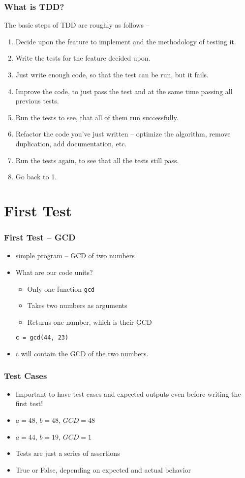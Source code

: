 \documentclass[12pt,presentation]{beamer}
\begin{document}
\begin{frame}
  \frametitle{What is TDD?}
  The basic steps of TDD are roughly as follows --
  \begin{enumerate}
  \item Decide upon the feature to implement and the methodology of
    testing it.
  \item Write the tests for the feature decided upon.
  \item Just write enough code, so that the test can be run, but it fails.
  \item Improve the code, to just pass the test and at the same time
    passing all previous tests.
  \item Run the tests to see, that all of them run successfully.
  \item Refactor the code you've just written -- optimize the algorithm,
    remove duplication, add documentation, etc.
  \item Run the tests again, to see that all the tests still pass.
  \item Go back to 1.
  \end{enumerate}
\end{frame}

\section{First Test}

\begin{frame}[fragile]
  \frametitle{First Test -- GCD}
  \begin{itemize}
  \item simple program -- GCD of two numbers
  \item What are our code units?
    \begin{itemize}
    \item Only one function \texttt{gcd}
    \item Takes two numbers as arguments
    \item Returns one number, which is their GCD
    \end{itemize}
\begin{lstlisting}
c = gcd(44, 23)
\end{lstlisting}
  \item c will contain the GCD of the two numbers.
  \end{itemize}
\end{frame}

\begin{frame}[fragile]
  \frametitle{Test Cases}
  \begin{itemize}
  \item Important to have test cases and expected outputs even before
    writing the first test!
  \item $a=48$, $b=48$, $GCD=48$
  \item $a=44$, $b=19$, $GCD=1$
  \item Tests are just a series of assertions
  \item True or False, depending on expected and actual behavior
  \end{itemize}

\end{frame}
\end{document}

